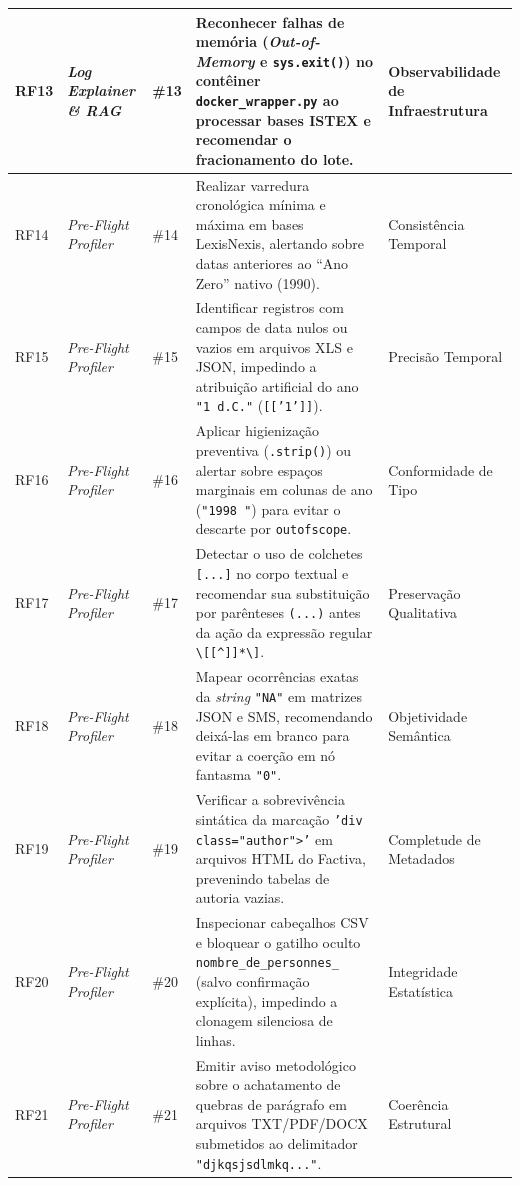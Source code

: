 \documentclass[
	oneside,
	a4paper,
	12pt,
	chapter=TITLE,
	section=TITLE,
	english,
	brazilian
]{abntex2}
\begin{document}
{\begin{xltabular}{\textwidth}{|>{\centering\arraybackslash}p{1.4cm}|>{\raggedright\arraybackslash}p{2.4cm}|>{\centering\arraybackslash}p{1.6cm}|>{\raggedright\arraybackslash}X|>{\raggedright\arraybackslash}p{2.8cm}|}
  RF13 & \textit{Log Explainer \& RAG} & \#13 & Reconhecer falhas de memória (\textit{Out-of-Memory} e \texttt{sys.\allowbreak exit()}) no contêiner \texttt{docker\_\allowbreak wrapper.\allowbreak py} ao processar bases ISTEX e recomendar o fracionamento do lote. & Observabilidade de Infraestrutura \\ \hline
  RF14 & \textit{Pre-Flight Profiler} & \#14 & Realizar varredura cronológica mínima e máxima em bases LexisNexis, alertando sobre datas anteriores ao ``Ano Zero'' nativo (1990). & Consistência Temporal \\ \hline
  RF15 & \textit{Pre-Flight Profiler} & \#15 & Identificar registros com campos de data nulos ou vazios em arquivos XLS e JSON, impedindo a atribuição artificial do ano \texttt{"1 d.\allowbreak C."} (\texttt{[['1']]}). & Precisão Temporal \\ \hline
  RF16 & \textit{Pre-Flight Profiler} & \#16 & Aplicar higienização preventiva (\texttt{.strip()}) ou alertar sobre espaços marginais em colunas de ano (\texttt{"1998 "}) para evitar o descarte por \texttt{outofscope}. & Conformidade de Tipo \\ \hline
  RF17 & \textit{Pre-Flight Profiler} & \#17 & Detectar o uso de colchetes \texttt{[...]} no corpo textual e recomendar sua substituição por parênteses \texttt{(...)} antes da ação da expressão regular \texttt{\textbackslash{}[[\textasciicircum{}]]*\textbackslash{}]}. & Preservação Qualitativa \\ \hline
  RF18 & \textit{Pre-Flight Profiler} & \#18 & Mapear ocorrências exatas da \textit{string} \texttt{"NA"} em matrizes JSON e SMS, recomendando deixá-las em branco para evitar a coerção em nó fantasma \texttt{"0"}. & Objetividade Semântica \\ \hline
  RF19 & \textit{Pre-Flight Profiler} & \#19 & Verificar a sobrevivência sintática da marcação \texttt{'div class="author">'} em arquivos HTML do Factiva, prevenindo tabelas de autoria vazias. & Completude de Metadados \\ \hline
  RF20 & \textit{Pre-Flight Profiler} & \#20 & Inspecionar cabeçalhos CSV e bloquear o gatilho oculto \texttt{nombre\_\allowbreak de\_\allowbreak personnes\_\allowbreak } (salvo confirmação explícita), impedindo a clonagem silenciosa de linhas. & Integridade Estatística \\ \hline
  RF21 & \textit{Pre-Flight Profiler} & \#21 & Emitir aviso metodológico sobre o achatamento de quebras de parágrafo em arquivos TXT/PDF/DOCX submetidos ao delimitador \texttt{"djkqsjsdlmkq..."}. & Coerência Estrutural \\ \hline

\end{xltabular}}
\end{document}
